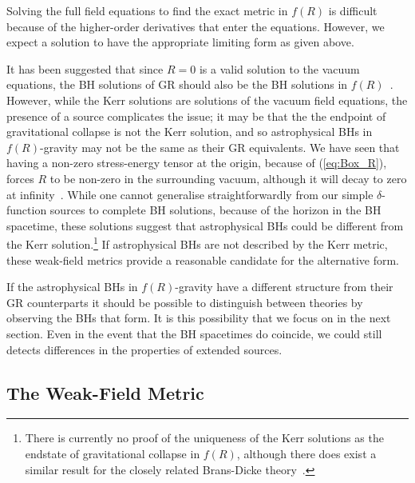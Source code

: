\documentclass[aps,prd,amsfonts,amssymb,amsmath,nofootinbib,reprint,showpacs]{revtex4-1}
\newcommand{\eqnref}[1]{(\ref{eq:#1})}
\begin{document}
Solving the full field equations to find the exact metric in $f(R)$ is difficult because of the higher-order derivatives that enter the equations. However, we expect a solution to have the appropriate limiting form as given above.

It has been suggested that since $R = 0$ is a valid solution to the vacuum equations, the BH solutions of GR should also be the BH solutions in $f(R)$~\cite{Psaltis2008, Barausse2008}. However, while the Kerr solutions are solutions of the vacuum field equations, the presence of a source complicates the issue; it may be that the the endpoint of gravitational collapse is not the Kerr solution, and so astrophysical BHs in $f(R)$-gravity may not be the same as their GR equivalents. We have seen that having a non-zero stress-energy tensor at the origin, because of \eqnref{Box_R}, forces $R$ to be non-zero in the surrounding vacuum, although it will decay to zero at infinity~\cite{Olmo2007c}. While one cannot generalise straightforwardly from our simple $\delta$-function sources to complete BH solutions, because of the horizon in the BH spacetime, these solutions suggest that astrophysical BHs could be different from the Kerr solution.\footnote{There is currently no proof of the uniqueness of the Kerr solutions as the endstate of gravitational collapse in $f(R)$, although there does exist a similar result for the closely related Brans-Dicke theory~\cite{Hawking1972a, Bekenstein1978, Thorne1971, Scheel1995}.} If astrophysical BHs are not described by the Kerr metric, these weak-field metrics provide a reasonable candidate for the alternative form.

If the astrophysical BHs in $f(R)$-gravity have a different structure from their GR counterparts it should be possible to distinguish between theories by observing the BHs that form. It is this possibility that we focus on in the next section. Even in the event that the BH spacetimes do coincide, we could still detects differences in the properties of extended sources.

\subsection{The Weak-Field Metric}
\end{document}
